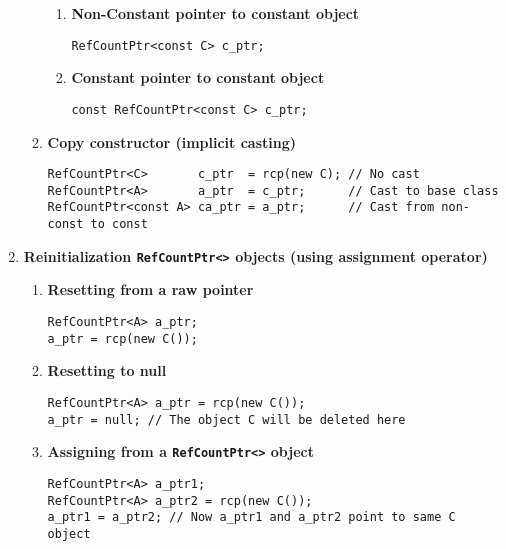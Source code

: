 \documentclass[pdf,ps2pdf,11pt]{SANDreport}
\begin{document}
\begin{enumerate}
\begin{enumerate}
\begin{enumerate}
%
\item {\bf Non-Constant pointer to constant object }
{\small\begin{verbatim}
RefCountPtr<const C> c_ptr;
\end{verbatim}}
%
\item {\bf Constant pointer to constant object }
{\small\begin{verbatim}
const RefCountPtr<const C> c_ptr;
\end{verbatim}}
%
\end{enumerate}
%
\item {\bf Copy constructor (implicit casting)}
%
{\small\begin{verbatim}
RefCountPtr<C>       c_ptr  = rcp(new C); // No cast
RefCountPtr<A>       a_ptr  = c_ptr;      // Cast to base class
RefCountPtr<const A> ca_ptr = a_ptr;      // Cast from non-const to const
\end{verbatim}}
%
\end{enumerate}

\item {\bf Reinitialization \texttt{RefCountPtr<>} objects (using assignment operator)}
%
\begin{enumerate}
%
\item {\bf Resetting from a raw pointer}
%
{\small\begin{verbatim}
RefCountPtr<A> a_ptr;
a_ptr = rcp(new C());
\end{verbatim}}
%
\item {\bf Resetting to null}
%
{\small\begin{verbatim}
RefCountPtr<A> a_ptr = rcp(new C());
a_ptr = null; // The object C will be deleted here
\end{verbatim}}
%
\item {\bf Assigning from a \texttt{RefCountPtr<>} object}
%
{\small\begin{verbatim}
RefCountPtr<A> a_ptr1;
RefCountPtr<A> a_ptr2 = rcp(new C());
a_ptr1 = a_ptr2; // Now a_ptr1 and a_ptr2 point to same C object
\end{verbatim}}
%
\end{enumerate}


\end{enumerate}
\end{document}
